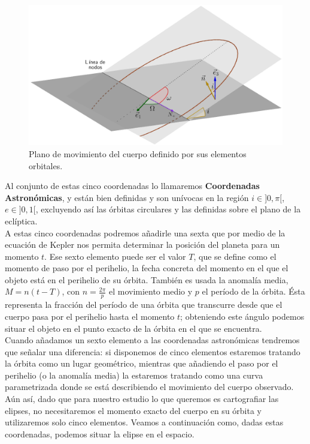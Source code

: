 \begin{figure}[H]
\centering
\includegraphics[scale=0.34]{images/omega_i.png}
\caption{Plano de movimiento del cuerpo definido por sus elementos orbitales.}
\label{fig:omega_i}
\end{figure}

Al conjunto de estas cinco coordenadas lo llamaremos \textbf{Coordenadas Astronómicas}, y están bien definidas y son unívocas en la región $i\in]0,\pi[$, $e\in]0,1[$, excluyendo así las órbitas circulares y las definidas sobre el plano de la eclíptica.\\

A estas cinco coordenadas podremos añadirle una sexta que por medio de la ecuación de Kepler nos permita determinar la posición del planeta para un momento $t$. Ese sexto elemento puede ser el valor $T$, que se define como el momento de paso por el perihelio, la fecha concreta del momento en el que el objeto está en el perihelio de su órbita. También es usada la anomalía media, $M=n(t-T)$, con $n=\frac{2\pi}{p}$ el movimiento medio y $p$ el período de la órbita. Ésta representa la fracción del período de una órbita que transcurre desde que el cuerpo pasa por el perihelio hasta el momento $t$; obteniendo este ángulo podemos situar el objeto en el punto exacto de la órbita en el que se encuentra.\\

Cuando añadamos un sexto elemento a las coordenadas astronómicas tendremos que señalar una diferencia: si disponemos de cinco elementos estaremos tratando la órbita como un lugar geométrico, mientras que añadiendo el paso por el perihelio (o la anomalía media) la estaremos tratando como una curva parametrizada donde se está describiendo el movimiento del cuerpo observado. Aún así, dado que para nuestro estudio lo que queremos es cartografiar las elipses, no necesitaremos el momento exacto del cuerpo en su órbita y utilizaremos solo cinco elementos. Veamos a continuación como, dadas estas coordenadas, podemos situar la elipse en el espacio.\\

